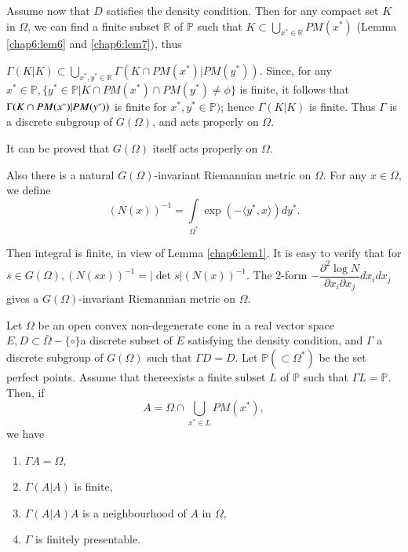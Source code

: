 Assume now that $D$ satisfies the density condition. Then for any
compact set $K$ in $\Omega$, we can find a finite subset $\mathbb{R}$
of $\mathbb{P}$ such that $K \subset \bigcup \limits_{x^* \in
  \mathbb{R}} PM(x^*)$ (Lemma \ref{chap6:lem6} and \ref{chap6:lem7}), thus 


$\Gamma (K|K) \subset \bigcup \limits_{x^*,y^* \in \mathbb{R}}
\Gamma(K \cap PM(x^*)|PM (y^*))$. Since, for any $x^* \in \mathbb{P},
\bigg\{y^* \in \mathbb{P}|K \cap PM(x^*)\cap PM(y^*) \neq \phi
\bigg\}$ is finite, it follows that $\Gamma (K \cap PM (x^*)|PM\break (y^*
))$ is finite for $x^*,y^*\in \mathbb{P})$; hence $\Gamma (K|K)$ is
finite. Thus $\Gamma$ is a discrete subgroup of $G(\Omega)$, and acts
properly on $\Omega$.  

\begin{remark*}
  It can be proved that $G(\Omega)$ itself acts properly on $\Omega$.
\end{remark*}

Also there is a natural $G(\Omega)$-invariant Riemannian metric on $\Omega$.
For any $ x \in \Omega $, we define
$$
(N(x))^{-1}= \int \limits_{\Omega^*} \exp (- \langle y^*,x \rangle ) dy^*.
$$

Then integral is finite, in view of Lemma \ref{chap6:lem1}. It is easy to verify
that for $s \in G(\Omega), (N(sx))^{-1} = | \det s | (N(x))^{-1}$. The
2-form $- \dfrac{\partial^2 \log N}{\partial x_i \partial x_j} dx_i dx_j$
gives a $G(\Omega)$-invariant Riemannian metric on $\Omega$. 

\setcounter{thm}{0}
\begin{thm}\label{chap6:thm1}%
  Let $\Omega$ be an open convex non-degenerate cone in a real vector
  space $E, D \subset \bar{\Omega}- \{\circ\}$a discrete subset of $E$
  satisfying the density condition, and $\Gamma$ a discrete subgroup of
  $G(\Omega)$ such that $\Gamma D=D$. Let $\mathbb{P}(\subset \Omega^*)$
  be the set perfect points. Assume that there\pageoriginale exists a finite subset
  $L$ of $\mathbb{P}$ such that $\Gamma L =\mathbb{P}$. Then, if  
  $$
  A = \Omega \cap \bigcup_{x^* \in L}PM(x^*),
  $$
  we have 
  \begin{enumerate}[\rm (a)]
  \item $\Gamma A = \Omega$,
  \item $\Gamma (A|A)$ is finite,
  \item $\Gamma (A|A)A$ is a neighbourhood of $A$ in $\Omega$,
  \item $\Gamma $ is finitely presentable.
  \end{enumerate}
\end{thm}

